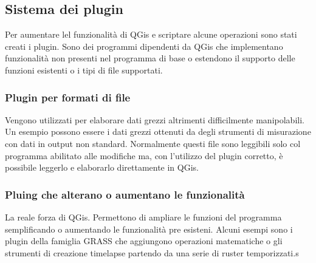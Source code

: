 \subsection{Sistema dei plugin}
Per aumentare lel funzionalità di QGis e scriptare alcune operazioni sono stati creati i plugin.
Sono dei programmi dipendenti da QGis che implementano funzionalità non presenti nel programma di base o estendono il supporto delle funzioni esistenti o i tipi di file supportati.

\subsubsection{Plugin per formati di file}
Vengono utilizzati per elaborare dati grezzi altrimenti difficilmente manipolabili.
Un esempio possono essere i dati grezzi ottenuti da degli strumenti di misurazione con dati in output non standard.
Normalmente questi file sono leggibili solo col programma abilitato alle modifiche ma, con l'utilizzo del plugin corretto, è possibile leggerlo e elaborarlo direttamente in QGis.

\subsubsection{Pluing che alterano o aumentano le funzionalità}
La reale forza di QGis. Permettono di ampliare le funzioni del programma semplificando o aumentando le funzionalità pre esisteni. Alcuni esempi sono i plugin della famiglia GRASS che aggiungono operazioni matematiche o gli strumenti di creazione timelapse partendo da una serie di ruster temporizzati.s
